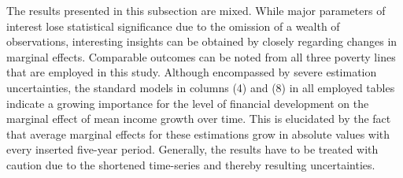 \documentclass[12pt, a4paper]{article}
\begin{document}
The results presented in this subsection are mixed. While major parameters of interest lose statistical significance due to the omission of a wealth of observations, interesting insights can be obtained by closely regarding changes in marginal effects. Comparable outcomes can be noted from all three poverty lines that are employed in this study. Although encompassed by severe estimation uncertainties, the standard models in columns (4) and (8) in all employed tables indicate a growing importance for the level of financial development on the marginal effect of mean income growth over time. This is elucidated by the fact that average marginal effects for these estimations grow in absolute values with every inserted five-year period. Generally, the results have to be treated with caution due to the shortened time-series and thereby resulting uncertainties.
\end{document}
